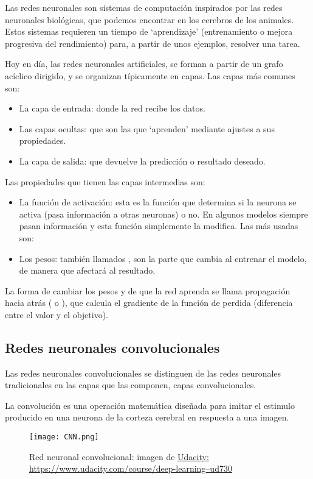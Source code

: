 Las redes neuronales son sistemas de computación inspirados por las redes neuronales biológicas, que podemos encontrar en los cerebros de los animales. Estos sistemas requieren un tiempo de `aprendizaje' (entrenamiento o mejora progresiva del rendimiento) para, a partir de unos ejemplos, resolver una tarea.

Hoy en día, las redes neuronales artificiales, se forman a partir de un grafo acíclico dirigido, y se organizan típicamente en capas. Las capas más comunes son: 
\begin{itemize}
\item La capa de entrada: donde la red recibe los datos.
\item Las capas ocultas: que son las que `aprenden' mediante ajustes a sus propiedades.
\item La capa de salida: que devuelve la predicción o resultado deseado.
\end{itemize}

Las propiedades que tienen las capas intermedias son:

\begin{itemize}
\item La función de activación: esta es la función que determina si la neurona se activa (pasa información a otras neuronas) o no. En algunos modelos siempre pasan información y esta función simplemente la modifica. Las más usadas son: 
\item Los pesos: también llamados , son la parte que cambia al entrenar el modelo, de manera que afectará al resultado.
\end{itemize}

La forma de cambiar los pesos y de que la red aprenda se llama propagación hacia atrás ( o ), que calcula el gradiente de la función de perdida (diferencia entre el valor y el objetivo). 

\subsection{Redes neuronales convolucionales}
Las redes neuronales convolucionales se distinguen de las redes neuronales tradicionales en las capas que las componen, capas convolucionales.

La convolución es una operación matemática diseñada para imitar el estimulo producido en una neurona de la corteza cerebral en respuesta a una imagen.


\begin{figure}
	\centering
	\texttt{[image: CNN.png]}
	\caption[Red neuronal convolucional]{Red neuronal convolucional: imagen de \href{https://www.udacity.com/course/deep-learning--ud730}{Udacity: https://www.udacity.com/course/deep-learning--ud730}}\label{fig:CNN.png}
\end{figure}

